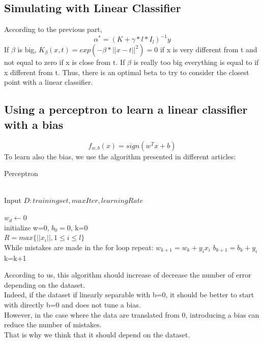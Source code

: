 \documentclass{article} %
\begin{document}
\subsection{Simulating  with Linear Classifier}

According to the previous part, 
\begin{equation*}
\alpha^{*}=(K+\gamma*l*I_{l})^{-1}y
\end{equation*}
If $\beta$ is big, $K_{\beta}(x,t)=exp(-\beta*||x-t||^2)=0$ if x is very different from t and not equal to zero if x is close from t. If $\beta$ is really too big everything is equal to if x different from t. Thus, there is an optimal beta to try to consider the closest point with a linear classifier.

\subsection{Using a perceptron to learn a linear classifier with a bias}
\begin{equation*}
f_{w,b}(x)=sign(w^{T}x+b)
\end{equation*}
To learn also the bias, we use the algorithm presented in different articles: 
\begin{algorithm} [H]
\caption{Perceptron}
\\Input $D: training set, maxIter, learningRate$ 
\begin{algorithmic} [1]
\State $w_d\gets 0$
\\initialize w=0, $b_{0}=0$, k=0
\\$R=max\{||x_{i}||, 1 \leq i \leq l\}$
 \\While mistakes are made in the for loop repeat:
   		     \State $w_{k+1}=w_{k}+y_{i}x_{i}$
		     \State $b_{k+1}=b_{k}+y_{i}$
		     \State k=k+1
  		 \EndIf
	 \EndFor
 \EndFor
\end{algorithmic}
\end{algorithm}

According to us, this algorithm should increase of decrease the number of error depending on the dataset.
\\ Indeed, if the dataset if linearly separable with b=0, it should be better to start with directly b=0 and does not tune a bias. 
\\However, in the case where the data are translated from 0, introducing a bias can reduce the number of mistakes. 
\\That is why we think that it should depend on the dataset. 
\end{document}
